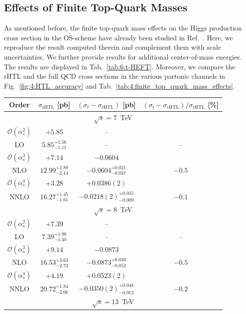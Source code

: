 \subsection{Effects of Finite Top-Quark Masses}
As mentioned before, the finite top-quark mass effects on the Higgs production cross section in the \acs{OS}-scheme have already been studied in Ref.~\cite{Czakon:2021yub}. Here, we reproduce the result computed therein and complement them with scale uncertainties. We further provide results for additional center-of-mass energies. The results are displayed in Tab.~\ref{tab:6:t-HEFT}. Moreover, we compare the \acs{rHTL} and the full \acs{QCD} cross sections in the various partonic channels in Fig.~\ref{fig:4:HTL_accuracy} and Tab.~\ref{tab:4:finite_top_quark_mass_effects}.
\begin{table}[ht]
\centering
\begin{tabular}{cccc}
Order  &  $\sigma_\text{rHTL}$ [pb] & $(\sigma_t - \sigma_\text{rHTL})$ [pb]  &  $(\sigma_t - \sigma_\text{rHTL})/\sigma_\text{rHTL}$ [\%]  \\
\hline
\hline
\multicolumn{4}{c}{$\sqrt{s}=7$~TeV}\\
\hline
$\mathcal{O}(\alpha_s^2)$ & $+5.85$ & -- &  \\
LO & $5.85^{+1.56}_{-1.11}$ & -- & --  \\
\hline
$\mathcal{O}(\alpha_s^3)$ & $+7.14$ & $-0.0604$ &  \\
NLO & $12.99^{+2.89}_{-2.14}$ & $-0.0604^{+0.021}_{-0.037}$ & $-0.5$  \\
\hline
$\mathcal{O}(\alpha_s^4)$ & $+3.28$ & $+0.0386(2)$ &  \\
NNLO & $16.27^{+1.45}_{-1.61}$ & $-0.0218(2)^{+0.035}_{-0.009}$ & $-0.1$  \\
\hline
\hline
\multicolumn{4}{c}{$\sqrt{s}=8$~TeV}\\
\hline
$\mathcal{O}(\alpha_s^2)$ & $+7.39$ & -- &  \\
LO & $7.39^{+1.98}_{-1.40}$ & -- & --  \\
\hline
$\mathcal{O}(\alpha_s^3)$ & $+9.14$ & $-0.0873$ &  \\
NLO & $16.53^{+3.63}_{-2.73}$ & $-0.0873^{+0.030}_{-0.052}$ & $-0.5$  \\
\hline
$\mathcal{O}(\alpha_s^4)$ & $+4.19$ & $+0.0523(2)$ &   \\
NNLO & $20.72^{+1.84}_{-2.06}$ & $-0.0350(2)^{+0.048}_{-0.013}$ & $-0.2$  \\
\hline
\hline
\multicolumn{4}{c}{$\sqrt{s}=13$~TeV}\\

\end{tabular}
\end{table}

